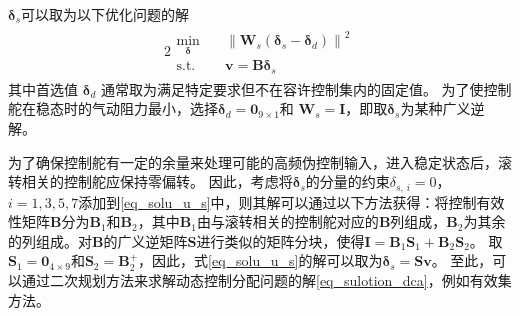 ${{\bm{ \delta}}_{ {s}}}$可以取为以下优化问题的解
\begin{alignat}{2}
\begin{split}
\mathop {{\text{min}}}\limits_{\bm{ \delta} }\quad&{\left\| {{\bm{W}_{ {s}}}\left( {{\bm{ \delta}_{ {s}}} - {\bm{ \delta}_{ {d}}}} \right)} \right\|^2} \\
\mbox{s.t.}\quad
&\bm{v }=\bm{B}\bm{ \delta}_{ {s}}
\end{split} \label{eq_solu_u_s}
\end{alignat}
其中首选值 ${{\bm{ \delta}}_{ {d}}}$ 通常取为满足特定要求但不在容许控制集内的固定值。 为了使控制舵在稳态时的气动阻力最小，选择${{\bm{ \delta}}_{ {d}}}={{\bm{0}}_{9\times 1}}$和 ${{\bm{W}}_{ {s}}}\bm{=I}$，即取${{\bm{ \delta}}_{ {s}}}$为某种广义逆解。

为了确保控制舵有一定的余量来处理可能的高频伪控制输入，进入稳定状态后，滚转相关的控制舵应保持零偏转。 因此，考虑将$ \bm{ \delta}_{ {s}} $的分量的约束${ \delta_{ {s},\, {i}}}=0$， $i=1,3,5,7$添加到\eqref{eq_solu_u_s}中，则其解可以通过以下方法获得：将控制有效性矩阵$\bm{B}$分为${{\bm{B}}_{1}}$和${{\bm{B}}_{2}}$，其中${{\bm{B}}_{1}}$由与滚转相关的控制舵对应的$\bm{B}$列组成，${{\bm{B}}_{2}}$为其余的列组成。对$\bm{B}$的广义逆矩阵$\bm{S}$进行类似的矩阵分块，使得$\bm{I} ={\bm{B}_1}{\bm{S}_1} + {\bm{B}_2}{\bm{S}_2}$。 取${{\bm{S}}_{1}}={{\bm{0}}_{4\times 9}}$和${{\bm{S}}_{2}}=\bm{B}_{2}^{+}$，因此，式\eqref{eq_solu_u_s}的解可以取为${{\bm{ \delta}}_{ {s}}}=\bm{S}\bm{v}$。 至此，可以通过二次规划方法来求解动态控制分配问题的解\eqref {eq_sulotion_dca}，例如有效集方法。

